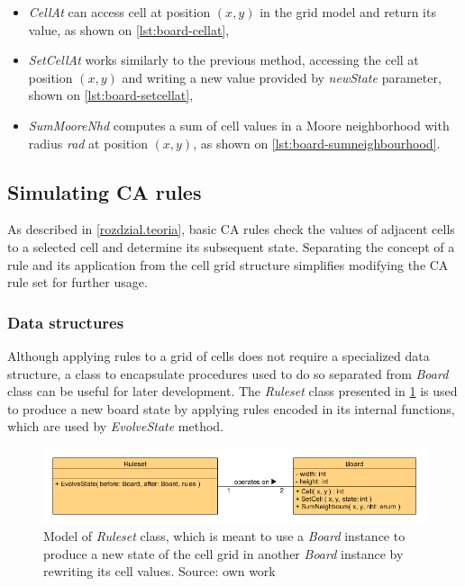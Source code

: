 \documentclass[12pt]{report}
\begin{document}
\begin{itemize}
	\item \textit{CellAt} can access cell at position $(x,y)$ in the grid model and return its value, as shown on \cref{lst:board-cellat},
	\item \textit{SetCellAt} works similarly to the previous method, accessing the cell at position $(x,y)$ and writing a new value provided by \textit{newState} parameter, shown on \cref{lst:board-setcellat},
	\item \textit{SumMooreNhd} computes a sum of cell values in a Moore neighborhood with radius \textit{rad} at position $(x,y)$, as shown on \cref{lst:board-sumneighbourhood}.
\end{itemize}
 
\pagebreak


 
\subsection{Simulating CA rules} 

As described in \cref{rozdzial.teoria}, basic CA rules check the values of adjacent cells to a selected cell and determine its subsequent state. Separating the concept of a rule and its application from the cell grid structure simplifies modifying the CA rule set for further usage.

\subsubsection{Data structures}

Although applying rules to a grid of cells does not require a specialized data structure, a class to encapsulate procedures used to do so separated from \textit{Board} class can be useful for later development. The \textit{Ruleset} class presented in \cref{fig:ruleset-board} is used to produce a new board state by applying rules encoded in its internal functions, which are used by \textit{EvolveState} method.

\begin{figure}[H]
	\centering
	\includegraphics[width=0.9\linewidth]{diagrams/ruleset-board}
	\caption{Model of \textit{Ruleset} class, which is meant to use a \textit{Board} instance to produce a new state of the cell grid in another \textit{Board} instance by rewriting its cell values. Source: own work}
	\label{fig:ruleset-board}
\end{figure}
\end{document}
